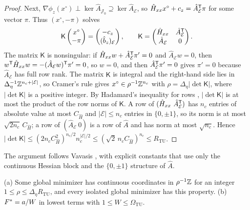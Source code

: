 \begin{proof}
Next, $\nabla\phi_z(x^\circ)\perp\ker\hat A_{\mathcal J_0}\supseteq\ker\hat A_{\mathcal E}$,
so $\hat H_{xx}x^\circ+c_z=\hat A_{\mathcal E}^{\mathsf T}\pi$ for some vector $\pi$.
Thus $(x^\circ,-\pi)$ solves
\[
\mathsf K\begin{pmatrix}x^\circ\\ -\pi\end{pmatrix}
=\begin{pmatrix}-c_z\\ (\hat b_z)_{\mathcal E}\end{pmatrix},\qquad
\mathsf K=\begin{pmatrix}\hat H_{xx}&\hat A_{\mathcal E}^{\mathsf T}\\ \hat A_{\mathcal E}&0\end{pmatrix}.
\]
The matrix $\mathsf K$ is nonsingular: if $\hat H_{xx}w+\hat A_{\mathcal E}^{\mathsf T}\pi'=0$
and $\hat A_{\mathcal E}w=0$, then $w^{\mathsf T}\hat H_{xx}w=-(\hat A_{\mathcal E}w)^{\mathsf T}\pi'=0$,
so $w=0$, and then $\hat A_{\mathcal E}^{\mathsf T}\pi'=0$ gives $\pi'=0$ because
$\hat A_{\mathcal E}$ has full row rank. The matrix $\mathsf K$ is integral and
the right-hand side lies in $\Delta_\eta^{-1}\mathbb Z^{n_c+\lvert\mathcal E\rvert}$,
so Cramer's rule gives $x^\circ\in\rho^{-1}\mathbb Z^{n_c}$ with
$\rho=\Delta_\eta\lvert\det\mathsf K\rvert$, where $\lvert\det\mathsf K\rvert$
is a positive integer. By Hadamard's inequality for rows
\cite{HornJohnson2013},
$\lvert\det\mathsf K\rvert$ is at most the product of the row norms of
$\mathsf K$. A row of
$(\hat H_{xx}\ \hat A_{\mathcal E}^{\mathsf T})$ has $n_c$ entries of absolute value at
most $C_{\hat H}$ and $\lvert\mathcal E\rvert\le n_c$ entries in $\{0,\pm1\}$,
so its norm is at most $\sqrt{2n_c}\,C_{\hat H}$; a row of
$(\hat A_{\mathcal E}\ 0)$ is a row of $\hat A$ and has norm at most
$\sqrt{n_c}$. Hence
$\lvert\det\mathsf K\rvert\le(2n_cC_{\hat H}^2)^{n_c/2}n_c^{\lvert\mathcal E\rvert/2}
\le(\sqrt2\,n_cC_{\hat H})^{n_c}\le R_{\mathrm{TU}}$.
\end{proof}

The argument follows Vavasis \cite{Vavasis1990}, with explicit
constants that use only the continuous Hessian block and the $\{0,\pm1\}$
structure of $\hat A$.

\begin{corollary}\label{cor:tu-height}
(a) Some global minimizer has continuous coordinates in $\rho^{-1}\mathbb Z$ for an
integer $1\le\rho\le\Delta_\eta R_{\mathrm{TU}}$, and every isolated global
minimizer has this property.
(b) $F^{*}=a/W$ in lowest terms with $1\le W\le\Omega_{\mathrm{TU}}$.
\end{corollary}


